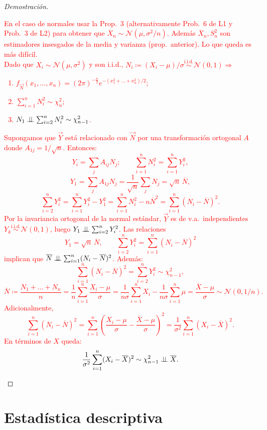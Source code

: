 \begin{proof}[Demostración]\textcolor{red}{
En el caso de normales usar la Prop.\ 3 (alternativamente Prob.\ 6 de L1 y Prob.\ 3 de L2) para obtener que $\overline{X}_n \sim \mathcal{N}(\mu, \sigma^2/n)$. Además $\overline{X}_n, S_n^2$ son estimadores insesgados de la media y varianza (prop.\ anterior). Lo que queda es más difícil. \\
Dado que $X_i \sim \mathcal{N}(\mu, \sigma^2)$ y son i.i.d., $N_i \coloneqq (X_i - \mu)/\sigma \stackrel{\text{i.i.d.}}{\sim} \mathcal{N}(0,1) \Rightarrow$
\begin{enumerate}[label=(\roman*)]
  \item $f_{\vec{N}}(x_1, \dots, x_n) = (2\pi)^{-\frac{n}{2}} e^{-(x_1^2 + \dots + x_n^2)/2}$;
  \item $\sum_{i=1}^n N_i^2 \sim \chi_n^2$;
  \item $N_1 \perp\!\!\!\perp \sum_{i=2}^n N_i^2 \sim \chi_{n-1}^2$.
\end{enumerate}
Supongamos que $\vec{Y}$ está relacionado con $\vec{N}$ por una transformación ortogonal $A$ donde $A_{1j} = 1/\sqrt{n}$. Entonces:
\[
  Y_i = \sum_j A_{ij} N_j; \qquad \sum_{i=1}^n N_i^2 = \sum_{i=1}^n Y_i^2,
\]
\[
  Y_1 = \sum_j A_{1j} N_j = \frac{1}{\sqrt{n}}\sum_j N_j = \sqrt{n}\,\overline{N},
\]
\[
  \sum_{i=2}^n Y_i^2 = \sum_{i=1}^n Y_i^2 - Y_1^2 = \sum_{i=1}^n N_i^2 - n\overline{N}^2 = \sum_{i=1}^n (N_i - \overline{N})^2.
\]
Por la invariancia ortogonal de la normal estándar, $\vec{Y}$ es de v.a.\ independientes $Y_k \stackrel{\text{i.i.d.}}{\sim} \mathcal{N}(0,1)$, luego $Y_1 \perp\!\!\!\perp \sum_{i=2}^n Y_i^2$. Las relaciones
\[
  Y_1 = \sqrt{n}\,\overline{N}, \qquad \sum_{i=2}^n Y_i^2 = \sum_{i=1}^n (N_i - \overline{N})^2
\]
implican que $\overline{N} \perp\!\!\!\perp \sum_{i=1}^n (N_i - \overline{N})^2$. Además:
\[
  \sum_{i=1}^n (N_i - \overline{N})^2 = \sum_{i=2}^n Y_i^2 \sim \chi_{n-1}^2,
\]
\[
  \overline{N} \coloneqq \frac{N_1 + \dots + N_n}{n} = \frac{1}{n}\sum_{i=1}^n \frac{X_i - \mu}{\sigma} = \frac{1}{n\sigma}\sum_{i=1}^n X_i - \frac{1}{n\sigma}\sum_{i=1}^n \mu = \frac{\overline{X} - \mu}{\sigma} \sim \mathcal{N}(0, 1/n).
\]
Adicionalmente,
\[
  \sum_{i=1}^n (N_i - \overline{N})^2 = \sum_{i=1}^n \left(\frac{X_i - \mu}{\sigma} - \frac{\overline{X} - \mu}{\sigma}\right)^2 = \frac{1}{\sigma^2}\sum_{i=1}^n (X_i - \overline{X})^2.
\]
En términos de $X$ queda:
\[
  \frac{1}{\sigma^2}\sum_{i=1}^n (X_i - \overline{X})^2 \sim \chi_{n-1}^2 \perp\!\!\!\perp \overline{X}.
\]}
\end{proof}

\section{Estadística descriptiva}

